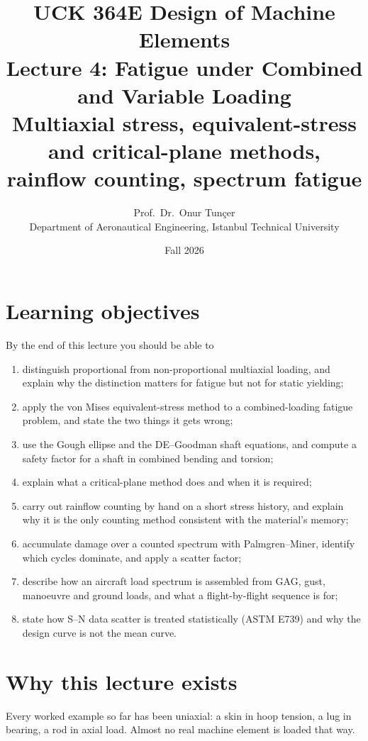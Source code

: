 \documentclass[11pt,a4paper]{article}
\title{\textbf{UCK 364E Design of Machine Elements}\\[4pt]
\Large Lecture 4: Fatigue under Combined and Variable Loading\\[2pt]
\large Multiaxial stress, equivalent-stress and critical-plane methods, rainflow counting, spectrum fatigue}
\author{Prof.\ Dr.\ Onur Tunçer\\ Department of Aeronautical Engineering, Istanbul Technical University}
\date{Fall 2026}
\begin{document}
\maketitle

\section*{Learning objectives}
By the end of this lecture you should be able to
\begin{enumerate}[nosep]
  \item distinguish proportional from non-proportional multiaxial loading, and explain why the distinction matters for fatigue but not for static yielding;
  \item apply the von Mises equivalent-stress method to a combined-loading fatigue problem, and state the two things it gets wrong;
  \item use the Gough ellipse and the DE--Goodman shaft equations, and compute a safety factor for a shaft in combined bending and torsion;
  \item explain what a critical-plane method does and when it is required;
  \item carry out rainflow counting by hand on a short stress history, and explain why it is the only counting method consistent with the material's memory;
  \item accumulate damage over a counted spectrum with Palmgren--Miner, identify which cycles dominate, and apply a scatter factor;
  \item describe how an aircraft load spectrum is assembled from GAG, gust, manoeuvre and ground loads, and what a flight-by-flight sequence is for;
  \item state how S--N data scatter is treated statistically (ASTM E739) and why the design curve is not the mean curve.
\end{enumerate}

\section{Why this lecture exists}

Every worked example so far has been uniaxial: a skin in hoop tension, a lug in bearing, a rod in axial load. Almost no real machine element is loaded that way.
\end{document}
